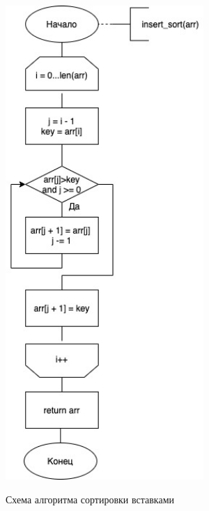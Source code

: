 \documentclass[12pt]{report}
\begin{document}
\begin{figure}
	\begin{center}
	{\includegraphics[height = 18cm]{insert.jpg}}
	\caption{Схема алгоритма сортировки вставками}
	\label{ris:imageInsert}
	\end{center}
\end{figure}
\end{document}
